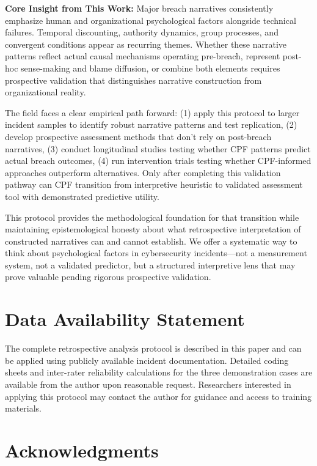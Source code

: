 \documentclass[11pt,a4paper]{article}
\begin{document}
\textbf{Core Insight from This Work:} Major breach narratives consistently emphasize human and organizational psychological factors alongside technical failures. Temporal discounting, authority dynamics, group processes, and convergent conditions appear as recurring themes. Whether these narrative patterns reflect actual causal mechanisms operating pre-breach, represent post-hoc sense-making and blame diffusion, or combine both elements requires prospective validation that distinguishes narrative construction from organizational reality.

The field faces a clear empirical path forward: (1) apply this protocol to larger incident samples to identify robust narrative patterns and test replication, (2) develop prospective assessment methods that don't rely on post-breach narratives, (3) conduct longitudinal studies testing whether CPF patterns predict actual breach outcomes, (4) run intervention trials testing whether CPF-informed approaches outperform alternatives. Only after completing this validation pathway can CPF transition from interpretive heuristic to validated assessment tool with demonstrated predictive utility.

This protocol provides the methodological foundation for that transition while maintaining epistemological honesty about what retrospective interpretation of constructed narratives can and cannot establish. We offer a systematic way to think about psychological factors in cybersecurity incidents—not a measurement system, not a validated predictor, but a structured interpretive lens that may prove valuable pending rigorous prospective validation.

\section*{Data Availability Statement}

The complete retrospective analysis protocol is described in this paper 
and can be applied using publicly available incident documentation. 
Detailed coding sheets and inter-rater reliability calculations for 
the three demonstration cases are available from the author upon 
reasonable request. Researchers interested in applying this protocol 
may contact the author for guidance and access to training materials.

\section*{Acknowledgments}
\end{document}
